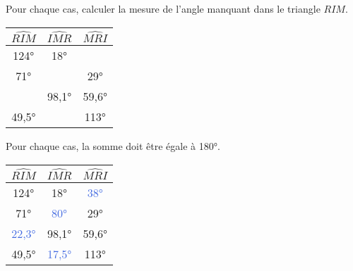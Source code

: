 \begin{Maquette}[Fiche,CorrigeFin,Colonnes=2]{}

   \begin{multicols}{2}

      \begin{exercice}[SLF] %
         Pour chaque cas, calculer la mesure de l'angle manquant dans le triangle $RIM$.
         \begin{center}
            \begin{tabular}{|*{3}{C{2}|}}
               \hline
               $\widehat{RIM}$ & $\widehat{IMR}$ & $\widehat{MRI}$ \\
               \hline
               \ang{124} & \ang{18} & \\
               \hline
               \ang{71} & & \ang{29} \\
               \hline
               & \ang{98,1} & \ang{59,6} \\
               \hline
               \ang{49,5} & & \ang{113} \\
               \hline
            \end{tabular}
         \end{center}
      \end{exercice}
      
      \begin{Solution}
         Pour chaque cas, la somme doit être égale à \ang{180}. \par
         {
         \begin{tabular}{|*{3}{C{2}|}}
            \hline
            $\widehat{RIM}$ & $\widehat{IMR}$ & $\widehat{MRI}$ \\
            \hline
            \ang{124} & \ang{18} & \textcolor{RoyalBlue}{\ang{38}} \\
            \hline
            \ang{71} & \textcolor{RoyalBlue}{\ang{80}} & \ang{29} \\
            \hline
            \textcolor{RoyalBlue}{\ang{22,3}} & \ang{98,1} & \ang{59,6} \\
            \hline
            \ang{49,5} & \textcolor{RoyalBlue}{\ang{17,5}} & \ang{113} \\
            \hline
         \end{tabular}}
      \end{Solution}
      

\end{multicols}
\end{Maquette}
